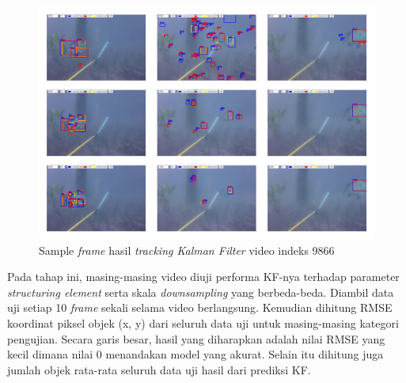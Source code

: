 	    \vspace{-0.5cm}
	    \begin{figure}[H]
	    	\centering
	    	\singlespacing
	    	\captionsetup{justification=centering,margin=0.5cm}
	    	\includegraphics[width=13cm]{image/9866/kf_results_9866.jpg}
	    	\caption{Sample \textit{frame} hasil \textit{tracking Kalman Filter} video indeks 9866}
	    	\label{fig:kf_results_9866}
	    \end{figure}
	    
	    Pada tahap ini, masing-masing video diuji performa KF-nya terhadap parameter \textit{structuring element} serta skala \textit{downsampling} yang berbeda-beda. Diambil data uji setiap 10 \textit{frame} sekali selama video berlangsung. Kemudian dihitung RMSE koordinat piksel objek (x, y) dari seluruh data uji untuk masing-masing kategori pengujian. Secara garis besar, hasil yang diharapkan adalah nilai RMSE yang kecil dimana nilai 0 menandakan model yang akurat. Selain itu dihitung juga jumlah objek rata-rata seluruh data uji hasil dari prediksi KF. 
	    

